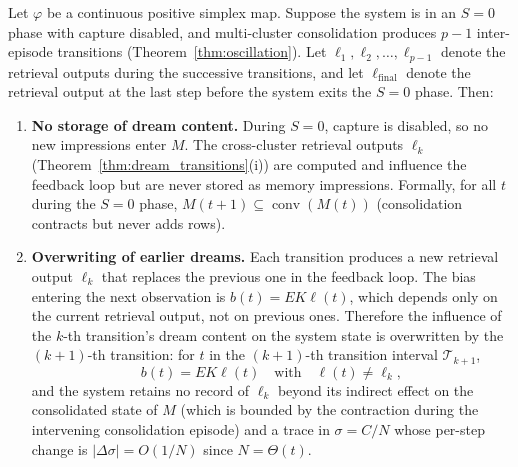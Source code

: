 \begin{theorem}
\label{thm:dream_amnesia}
\leanok
{}
Let $\varphi$ be a continuous positive simplex map.  Suppose the system is in an $S = 0$ phase with capture disabled, and multi-cluster consolidation produces $p - 1$ inter-episode transitions (Theorem~\ref{thm:oscillation}).  Let $\ell_1, \ell_2, \ldots, \ell_{p-1}$ denote the retrieval outputs during the successive transitions, and let $\ell_{\mathrm{final}}$ denote the retrieval output at the last step before the system exits the $S = 0$ phase.  Then:

\begin{enumerate}
\item \textbf{No storage of dream content.}  During $S = 0$, capture is disabled, so no new impressions enter $M$.  The cross-cluster retrieval outputs $\ell_k$ (Theorem~\ref{thm:dream_transitions}(i)) are computed and influence the feedback loop but are never stored as memory impressions.  Formally, for all $t$ during the $S = 0$ phase, $M(t+1) \subseteq \operatorname{conv}(M(t))$ (consolidation contracts but never adds rows).

\item \textbf{Overwriting of earlier dreams.}  Each transition produces a new retrieval output $\ell_k$ that replaces the previous one in the feedback loop.  The bias entering the next observation is $b(t) = EK\ell(t)$, which depends only on the current retrieval output, not on previous ones.  Therefore the influence of the $k$-th transition's dream content on the system state is overwritten by the $(k+1)$-th transition: for $t$ in the $(k+1)$-th transition interval $\mathcal{T}_{k+1}$,
\[
b(t) = EK\ell(t) \quad\text{with}\quad \ell(t) \neq \ell_k,
\]
and the system retains no record of $\ell_k$ beyond its indirect effect on the consolidated state of $M$ (which is bounded by the contraction during the intervening consolidation episode) and a trace in $\sigma = C/N$ whose per-step change is $|\Delta\sigma| = O(1/N)$ since $N = \Theta(t)$.


\end{enumerate}
\end{theorem}
